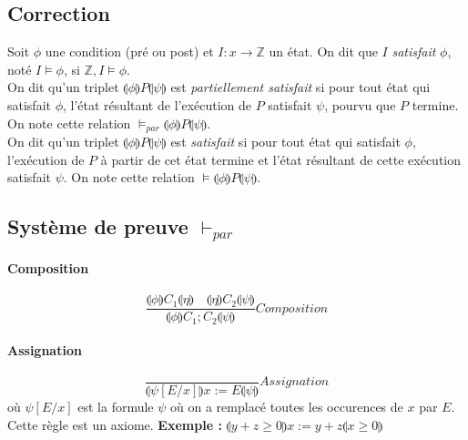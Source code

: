 \documentclass[a4paper]{article}
\begin{document}
  \subsection{Correction}
  Soit $\phi$ une condition (pré ou post) et $I:x\rightarrow \mathbb{Z}$ 
un état. 
  On dit que $I$ \textit{satisfait} $\phi$, noté $I \vDash \phi$, si 
$\mathbb{Z}, I \vDash \phi$.\\

  On dit qu'un triplet $\llparenthesis \phi\rrparenthesis 
P\llparenthesis \psi\rrparenthesis $ est \textit{partiellement 
satisfait} si
  pour tout état qui satisfait $\phi$, l'état résultant de l'exécution 
de $P$
  satisfait $\psi$, pourvu que $P$ termine. On note cette relation 
$\vDash_{par} \llparenthesis \phi\rrparenthesis P\llparenthesis 
\psi\rrparenthesis $.\\

  On dit qu'un triplet $\llparenthesis \phi\rrparenthesis 
P\llparenthesis \psi\rrparenthesis $ est \textit{satisfait} si
  pour tout état qui satisfait $\phi$, l'exécution de $P$ à partir de 
cet état termine
  et l'état résultant de cette exécution satisfait $\psi$. On note cette 
relation $\vDash \llparenthesis \phi\rrparenthesis P\llparenthesis 
\psi\rrparenthesis $.

  \subsection{Système de preuve $\vdash_{par}$}

  \paragraph{Composition}
  $$ \frac{\llparenthesis \phi\rrparenthesis C_1\llparenthesis 
\eta\rrparenthesis \quad \llparenthesis \eta\rrparenthesis 
C_2\llparenthesis \psi\rrparenthesis }{\llparenthesis \phi\rrparenthesis 
C_1;C_2 \llparenthesis \psi\rrparenthesis }Composition $$

  \paragraph{Assignation}
  $$ \frac{}{\llparenthesis \psi[E/x] \rrparenthesis x:=E \llparenthesis 
\psi \rrparenthesis}Assignation $$
  où $\psi[E/x]$ est la formule $\psi$ où on a remplacé toutes les 
occurences de $x$ par $E$.
  Cette règle est un axiome. \textbf{Exemple :} $\llparenthesis y+z \geq 
0 \rrparenthesis x:= y+z \llparenthesis x \geq 0 \rrparenthesis$
\end{document}
